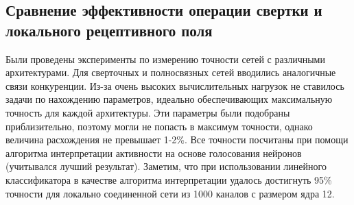 \documentclass[a4paper]{article}
\begin{document}
\subsection{Сравнение эффективности операции свертки и локального рецептивного поля}
Были проведены эксперименты по измерению точности сетей с различными архитектурами. Для сверточных и полносвязных сетей вводились аналогичные связи конкуренции. Из-за очень высоких вычислительных нагрузок не ставилось задачи по нахождению параметров, идеально обеспечивающих максимальную точность для каждой архитектуры. Эти параметры были подобраны приблизительно, поэтому могли не попасть в максимум точности, однако величина расхождения не превышает 1-2\%. Все точности посчитаны при помощи алгоритма интерпретации активности на основе голосования нейронов (учитывался лучший результат). Заметим, что при использовании линейного классификатора в качестве алгоритма интерпретации удалось достигнуть 95\% точности для локально соединенной сети из 1000 каналов с размером ядра 12.
\end{document}
